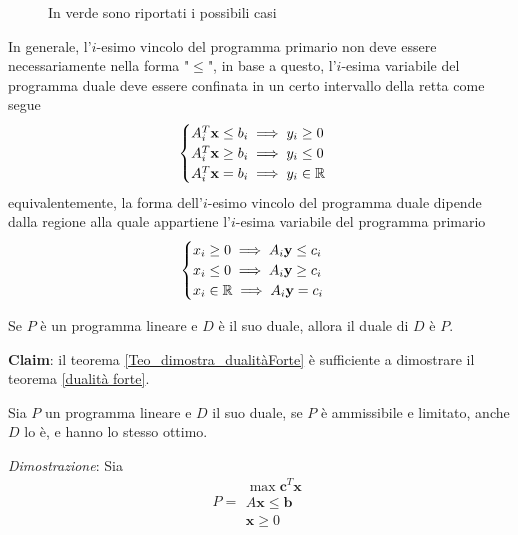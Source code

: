 \documentclass[10pt, letterpaper]{report}
\begin{document}
\begin{figure}[h]
    \caption{In verde sono riportati i possibili casi}
\end{figure}

In generale, l'$i$-esimo vincolo del programma primario non deve essere necessariamente nella forma "$\le$", in base a questo, l'$i$-esima variabile del programma duale deve essere confinata in un certo intervallo della retta come segue$$
\begin{cases}
    A_i^T\mathbf x\le b_i \implies y_i \ge 0\\
    A_i^T\mathbf x\ge b_i \implies y_i \le 0\\
    A_i^T\mathbf x= b_i \implies y_i \in {\mathbb R}
\end{cases}$$
equivalentemente, la forma dell'$i$-esimo vincolo del programma duale dipende dalla regione alla quale appartiene l'$i$-esima variabile del programma primario 
$$\begin{cases}
    x_i \ge 0 \implies A_i\mathbf y \le c_i\\ 
    x_i \le 0 \implies A_i\mathbf y \ge c_i\\ 
    x_i \in {\mathbb R}\implies A_i\mathbf y = c_i
\end{cases}$$
\begin{proposizione}
    Se $P$ è un programma lineare e $D$ è il suo duale, allora il duale di $D$ è $P$.
\end{proposizione}
\textbf{Claim}: il teorema \ref{Teo_dimostra_dualitàForte} è sufficiente a dimostrare il teorema \ref{dualità forte}.  
\begin{teorema}\label{Teo_dimostra_dualitàForte}
    Sia $P$ un programma lineare e $D$ il suo duale, se $P$ è ammissibile e limitato, anche $D$ lo è, e hanno lo stesso ottimo.
\end{teorema}
\textit{Dimostrazione}: Sia 
$$ P=\begin{matrix}
    \max \mathbf c^T\mathbf x\\ 
        A\mathbf x \le \mathbf b \\ 
        \mathbf x \ge 0 
\end{matrix}$$
\end{document}
